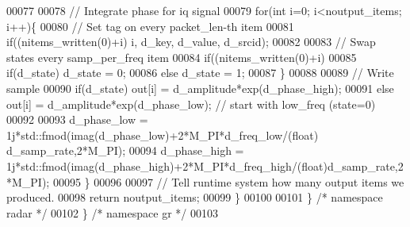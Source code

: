 \begin{DoxyCode}
00077         
00078         \textcolor{comment}{// Integrate phase for iq signal}
00079         \textcolor{keywordflow}{for}(\textcolor{keywordtype}{int} i=0; i<noutput\_items; i++)\{
00080             \textcolor{comment}{// Set tag on every packet\_len-th item}
00081             \textcolor{keywordflow}{if}((nitems\_written(0)+i)%
      i, d_key, d_value, d_srcid);
00082             
00083             \textcolor{comment}{// Swap states every samp\_per\_freq item}
00084             \textcolor{keywordflow}{if}((nitems\_written(0)+i)%
00085                 \textcolor{keywordflow}{if}(d_state) d_state = 0;
00086                 \textcolor{keywordflow}{else} d_state = 1;
00087             \}
00088             
00089             \textcolor{comment}{// Write sample}
00090             \textcolor{keywordflow}{if}(d_state) out[i] = d_amplitude*exp(d_phase_high);
00091             \textcolor{keywordflow}{else} out[i] = d_amplitude*exp(d_phase_low); \textcolor{comment}{// start with low\_freq (state=0)}
00092             
00093             d_phase_low = 1j*std::fmod(imag(d_phase_low)+2*M\_PI*d_freq_low/(\textcolor{keywordtype}{float})
      d_samp_rate,2*M\_PI);
00094             d_phase_high = 1j*std::fmod(imag(d_phase_high)+2*M\_PI*d_freq_high/(\textcolor{keywordtype}{float})d\_samp\_rate,2*M\_PI);
00095         \}
00096 
00097         \textcolor{comment}{// Tell runtime system how many output items we produced.}
00098         \textcolor{keywordflow}{return} noutput\_items;
00099     \}
00100 
00101   \} \textcolor{comment}{/* namespace radar */}
00102 \} \textcolor{comment}{/* namespace gr */}
00103 
\end{DoxyCode}
